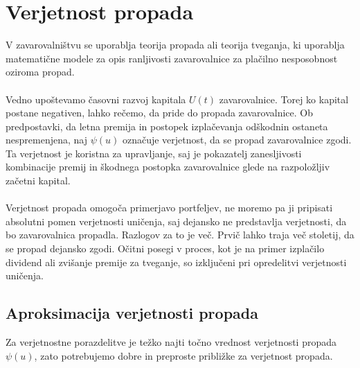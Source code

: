 \documentclass[a4paper,12pt]{homework}
\begin{document}
	\section{Verjetnost propada}
	V zavarovalništvu se uporablja teorija propada ali teorija tveganja, ki uporablja matematične modele za opis ranljivosti zavarovalnice za plačilno nesposobnost oziroma propad. 
	\\
	\\
	Vedno upoštevamo časovni razvoj kapitala $U(t)$ zavarovalnice. Torej ko kapital postane negativen, lahko rečemo, da pride do propada zavarovalnice. Ob predpostavki, da letna premija in postopek izplačevanja odškodnin ostaneta nespremenjena, naj $\psi(u)$ označuje verjetnost, da se propad zavarovalnice zgodi. Ta verjetnost je koristna za upravljanje, saj je pokazatelj zanesljivosti kombinacije premij in škodnega postopka zavarovalnice glede na razpoložljiv začetni kapital.
	\\
	\\
	Verjetnost propada omogoča primerjavo portfeljev, ne moremo pa ji pripisati absolutni pomen verjetnosti uničenja, saj dejansko ne predstavlja verjetnosti, da bo zavarovalnica propadla. Razlogov za to je več. Prvič lahko traja več stoletij, da se propad dejansko zgodi. Očitni posegi v proces, kot je na primer izplačilo dividend ali zvišanje premije za tveganje, so izključeni pri opredelitvi verjetnosti uničenja. 
	
	\subsection{Aproksimacija verjetnosti propada}
	Za verjetnostne porazdelitve je težko najti točno vrednost verjetnosti propada $\psi(u)$, zato potrebujemo dobre in preproste približke za verjetnost propada.
	
\end{document}
